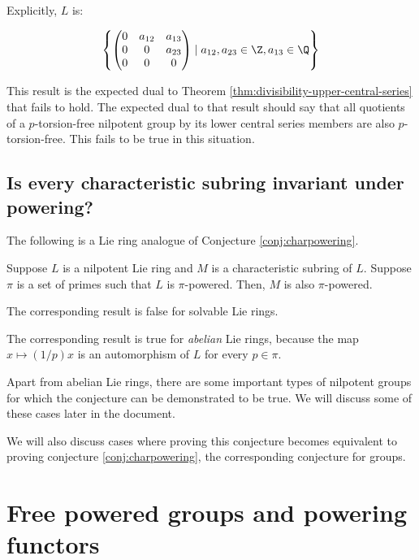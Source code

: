 \documentclass{ucetd}
\begin{document}
\begin{enumerate}
  Explicitly, $L$ is:

  $$\left \{\begin{pmatrix}
0 & a_{12} & a_{13} \\
0 & 0 & a_{23}\\
0 & 0 & 0\end{pmatrix} \mid a_{12},a_{23} \in \Z, a_{13} \in \Q \right \}$$

  This result is the expected dual to Theorem
  \ref{thm:divisibility-upper-central-series} that fails to hold. The
  expected dual to that result should say that all quotients of a
  $p$-torsion-free nilpotent group by its lower central series members
  are also $p$-torsion-free. This fails to be true in this situation.
\end{enumerate}

\subsection{Is every characteristic subring invariant under powering?}

The following is a Lie ring analogue of Conjecture \ref{conj:charpowering}.

\begin{conjecture}\label{conj:charpowering-lie}
  Suppose $L$ is a nilpotent Lie ring and $M$ is a characteristic
  subring of $L$. Suppose $\pi$ is a set of primes such that $L$ is
  $\pi$-powered. Then, $M$ is also $\pi$-powered.
\end{conjecture}

The corresponding result is false for solvable Lie rings.

The corresponding result is true for {\em abelian} Lie rings, because
the map $x \mapsto (1/p)x$ is an automorphism of $L$ for every $p \in
\pi$.

Apart from abelian Lie rings, there are some important types of
nilpotent groups for which the conjecture can be demonstrated to be
true. We will discuss some of these cases later in the document.

We will also discuss cases where proving this conjecture becomes
equivalent to proving conjecture \ref{conj:charpowering}, the
corresponding conjecture for groups.

\section{Free powered groups and powering functors}\label{sec:free-powered-groups-and-powering-functors}
\end{document}
